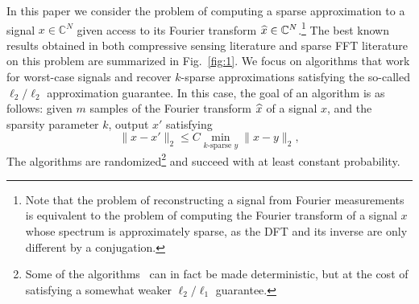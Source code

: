 In this paper we consider the problem of computing a sparse approximation to a signal $x\in \mathbb{C}^N$ given access to its Fourier transform $\widehat{x}\in \mathbb{C}^N$.\footnote{Note that the problem of reconstructing a signal from Fourier measurements is equivalent to the problem of computing the Fourier transform of a signal $x$ whose spectrum is approximately sparse, as the DFT and its inverse are only different by a conjugation.} The best known results obtained in both compressive sensing literature and sparse FFT literature on this problem are summarized in Fig.~\ref{fig:1}. 
We focus on algorithms that work for worst-case signals and recover $k$-sparse approximations satisfying the so-called $\ell_2/\ell_2$ approximation
guarantee. In this case, the goal of an algorithm is as follows: given $m$ samples of the Fourier transform $\widehat{x}$ of a signal $x$,  and the sparsity parameter $k$, output $x'$ satisfying
\begin{equation}
\label{e:l2l2}
\| x-x'\|_2 \le C \min_{k \text{-sparse } y }  \|x-y\|_2,
\end{equation}
The algorithms are randomized\footnote{Some of the algorithms~\cite{CTao,RV,CGV} can in
  fact be made deterministic, but at the cost of satisfying a somewhat
  weaker $\ell_2/\ell_1$ guarantee.}
 and succeed with at least constant probability.
 
